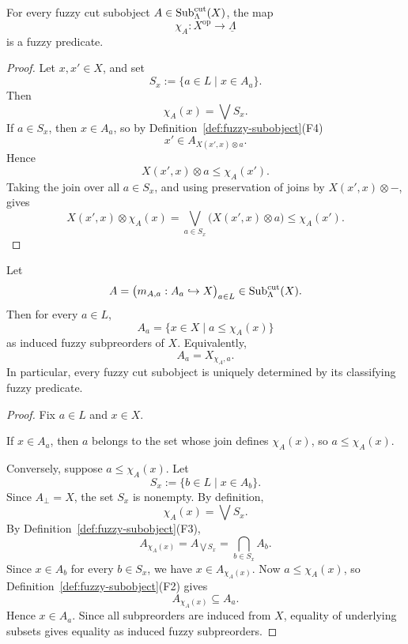 \begin{proposition}
\label{prop:coherent-cut-family-gives-predicate}
    For every fuzzy cut subobject \(A\in\mathrm{Sub}^{\mathrm{cut}}_\Lambda(X)\), the map
    \[
        \chi_A:X^{\mathrm{op}}\to\underline{\Lambda}
    \]
    is a fuzzy predicate.
\end{proposition}

\begin{proof}
    Let \(x,x'\in X\), and set
    \[
        S_x:=\{a\in L\mid x\in A_a\}.
    \]
    Then
    \[
        \chi_A(x)=\bigvee S_x.
    \]
    If \(a\in S_x\), then \(x\in A_a\), so by Definition~\ref{def:fuzzy-subobject}\textup{(F4)}
    \[
        x'\in A_{X(x',x)\otimes a}.
    \]
    Hence
    \[
        X(x',x)\otimes a\leq\chi_A(x').
    \]
    Taking the join over all \(a\in S_x\), and using preservation of joins by \(X(x',x)\otimes-\), gives
    \[
        X(x',x)\otimes\chi_A(x)
        =
        \bigvee_{a\in S_x}\bigl(X(x',x)\otimes a\bigr)
        \leq
        \chi_A(x').
    \]
\end{proof}

\begin{proposition}
\label{prop:recover-cuts-from-classifying-predicate}
    Let
    \[
        A=\bigl(m_{A,a}:A_a\hookrightarrow X\bigr)_{a\in L}
        \in\mathrm{Sub}^{\mathrm{cut}}_\Lambda(X).
    \]
    Then for every \(a\in L\),
    \[
        A_a
        =
        \{x\in X\mid a\leq\chi_A(x)\}
    \]
    as induced fuzzy subpreorders of \(X\). Equivalently,
    \[
        A_a=X_{\chi_A,a}.
    \]
    In particular, every fuzzy cut subobject is uniquely determined by its classifying fuzzy predicate.
\end{proposition}

\begin{proof}
    Fix \(a\in L\) and \(x\in X\).

    If \(x\in A_a\), then \(a\) belongs to the set whose join defines \(\chi_A(x)\), so \(a\leq\chi_A(x)\).

    Conversely, suppose \(a\leq\chi_A(x)\). Let
    \[
        S_x:=\{b\in L\mid x\in A_b\}.
    \]
    Since \(A_\bot=X\), the set \(S_x\) is nonempty. By definition,
    \[
        \chi_A(x)=\bigvee S_x.
    \]
    By Definition~\ref{def:fuzzy-subobject}\textup{(F3)},
    \[
        A_{\chi_A(x)}
        =
        A_{\bigvee S_x}
        =
        \bigcap_{b\in S_x}A_b.
    \]
    Since \(x\in A_b\) for every \(b\in S_x\), we have \(x\in A_{\chi_A(x)}\). Now \(a\leq\chi_A(x)\), so Definition~\ref{def:fuzzy-subobject}\textup{(F2)} gives
    \[
        A_{\chi_A(x)}\subseteq A_a.
    \]
    Hence \(x\in A_a\). Since all subpreorders are induced from \(X\), equality of underlying subsets gives equality as induced fuzzy subpreorders.
\end{proof}

